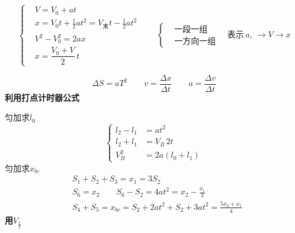 \[
\left\{\begin{aligned}
&V=V_0+at\\
&x=V_0t+\tfrac12at^2=V_{\text{末}}t-\tfrac12at^2\\
&V^2-V_0^2=2ax\\
&x=\dfrac{V_0+V}{2}\,t
\end{aligned}\right.
\qquad
\left\{\begin{aligned}
&\text{一段一组}\\
&\text{一方向一组}
\end{aligned}\right.
\quad\text{表示}\,a,\ \to V\to x
\]

\[
\Delta S=aT^2\qquad v=\frac{\Delta x}{\Delta t}\qquad a=\frac{\Delta v}{\Delta t}
\]
\textbf{利用打点计时器公式}

匀加\quad 求$l_0$
\[
\left\{\begin{aligned}
l_2-l_1&=at^2\\
l_2+l_1&=V_B\,2t\\
V_B^2&=2a(l_0+l_1)
\end{aligned}\right.
\]
匀加\quad 求$x_{bc}$
\begin{align*}
&S_1+S_2+S_3=x_1=3S_2\\
&S_6=x_2\qquad S_6-S_2=4at^2=x_2-\frac{x_1}{3}\\
&S_4+S_5=x_{bc}=S_2+2at^2+S_2+3at^2=\frac{5x_2+x_1}{4}
\end{align*}
\textbf{用$V_{\frac t2}$}

